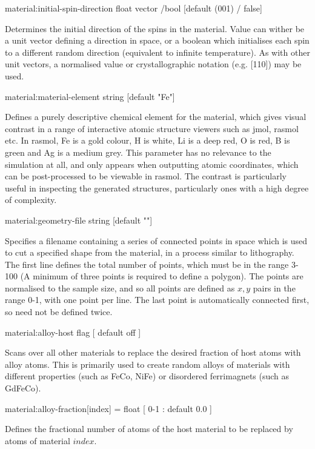 {\zicf material:initial-spin-direction float vector /bool [default (001) / false]} Determines the initial direction of the spins in the material. Value can wither be a unit vector defining a direction in space, or a boolean which initialises each spin to a different random direction (equivalent to infinite temperature). As with other unit vectors, a  normalised value or crystallographic notation (e.g. [110]) may be used.

{\zicf material:material-element string [default "Fe"]} Defines a purely descriptive chemical element for the material, which gives visual contrast in a range of interactive atomic structure viewers such as jmol, rasmol etc. In rasmol, Fe is a gold colour, H is white, Li is a deep red, O is red, B is green and Ag is a medium grey. This parameter has no relevance to the simulation at all, and only appears when outputting atomic coordinates, which can be post-processed to be viewable in rasmol. The contrast is particularly useful in inspecting the generated structures, particularly ones with a high degree of complexity.

{\zicf material:geometry-file string [default ""]} Specifies a filename containing a series of connected points in space which is used to cut a specified shape from the material, in a process similar to lithography. The first line defines the total number of points, which must be in the range 3-100 (A minimum of three points is required to define a polygon). The points are normalised to the sample size, and so all points are defined as $x,y$ pairs in the range 0-1, with one point per line. The last point is automatically connected first, so need not be defined twice.

{\zicf material:alloy-host flag [ default off ]} Scans over all other materials to replace the desired fraction of host atoms with alloy atoms. This is primarily used to create random alloys of materials with different properties (such as FeCo, NiFe) or disordered ferrimagnets (such as GdFeCo).


{\zicf material:alloy-fraction[index] = float [ 0-1 : default 0.0 ]} Defines the fractional number of atoms of the host material to be replaced by atoms of material $index$.

